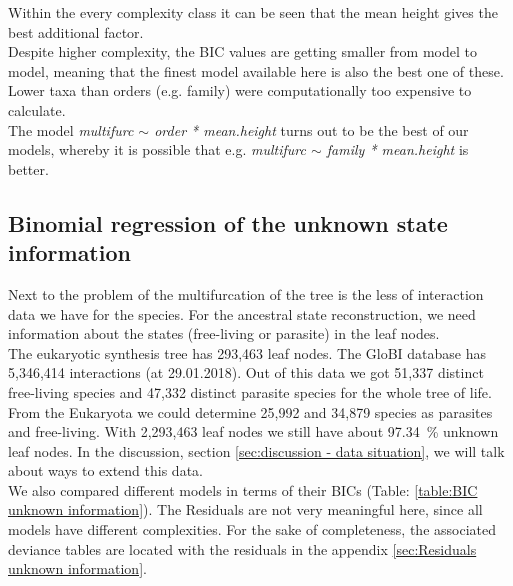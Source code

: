       Within the every complexity class it can be seen that the mean height gives the best additional factor. \\
      Despite higher complexity, the BIC values are getting smaller from model to model, meaning that 
        the finest model available here is also the best one of these. Lower taxa than orders (e.g. 
        family) were computationally too expensive to calculate. \\
      The model \textit{multifurc $\sim$ order * mean.height} turns out to be the best of our models, 
        whereby it is possible that e.g. \textit{multifurc $\sim$ family * mean.height} is better.

    \subsection{Binomial regression of the unknown state information}

      Next to the problem of the multifurcation of the tree is the less of interaction data we have for 
        the species. For the ancestral state reconstruction, we need information about the states 
        (free-living or parasite) in the leaf nodes. \\
      The eukaryotic synthesis tree has 293,463 leaf nodes. The GloBI database has 5,346,414 interactions 
        (at 29.01.2018). Out of this data we got 51,337 distinct free-living species and 47,332 
        distinct parasite species for the whole tree of life. From the Eukaryota we could determine 
        25,992 and 34,879 species as parasites and free-living. With 2,293,463 leaf nodes we still have 
        about 97.34~\% unknown leaf nodes. In the discussion, section 
        \ref{sec:discussion - data situation}, we will talk about ways to extend this data. \\
      
      We also compared different models in terms of their BICs (Table: \ref{table:BIC unknown information}). 
        The Residuals are not very meaningful here, since all models have different complexities. %
        For the sake of completeness, the associated deviance tables are located with the residuals in 
        the appendix \ref{sec:Residuals unknown information}.

